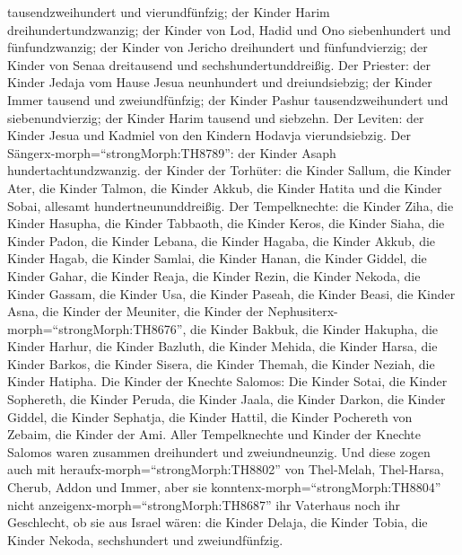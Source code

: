 tausendzweihundert und vierundfünfzig;  der Kinder Harim
dreihundertundzwanzig;  der Kinder von Lod, Hadid und Ono
siebenhundert und fünfundzwanzig;  der Kinder von Jericho
dreihundert und fünfundvierzig;  der Kinder von Senaa
dreitausend und sechshundertunddreißig.  Der Priester: der
Kinder Jedaja vom Hause Jesua neunhundert und dreiundsiebzig;
 der Kinder Immer tausend und zweiundfünfzig; 
der Kinder Pashur tausendzweihundert und siebenundvierzig; 
der Kinder Harim tausend und siebzehn.  Der Leviten: der
Kinder Jesua und Kadmiel von den Kindern Hodavja vierundsiebzig.
 Der Sängerx-morph=``strongMorph:TH8789'': der Kinder Asaph
hundertachtundzwanzig.  der Kinder der Torhüter: die Kinder
Sallum, die Kinder Ater, die Kinder Talmon, die Kinder Akkub, die Kinder
Hatita und die Kinder Sobai, allesamt hundertneununddreißig.
 Der Tempelknechte: die Kinder Ziha, die Kinder Hasupha,
die Kinder Tabbaoth,  die Kinder Keros, die Kinder Siaha,
die Kinder Padon,  die Kinder Lebana, die Kinder Hagaba,
die Kinder Akkub,  die Kinder Hagab, die Kinder Samlai, die
Kinder Hanan,  die Kinder Giddel, die Kinder Gahar, die
Kinder Reaja,  die Kinder Rezin, die Kinder Nekoda, die
Kinder Gassam,  die Kinder Usa, die Kinder Paseah, die
Kinder Beasi,  die Kinder Asna, die Kinder der Meuniter,
die Kinder der Nephusiterx-morph=``strongMorph:TH8676'', 
die Kinder Bakbuk, die Kinder Hakupha, die Kinder Harhur, 
die Kinder Bazluth, die Kinder Mehida, die Kinder Harsa, 
die Kinder Barkos, die Kinder Sisera, die Kinder Themah, 
die Kinder Neziah, die Kinder Hatipha.  Die Kinder der
Knechte Salomos: Die Kinder Sotai, die Kinder Sophereth, die Kinder
Peruda,  die Kinder Jaala, die Kinder Darkon, die Kinder
Giddel,  die Kinder Sephatja, die Kinder Hattil, die Kinder
Pochereth von Zebaim, die Kinder der Ami.  Aller
Tempelknechte und Kinder der Knechte Salomos waren zusammen dreihundert
und zweiundneunzig.  Und diese zogen auch mit
heraufx-morph=``strongMorph:TH8802'' von Thel-Melah, Thel-Harsa, Cherub,
Addon und Immer, aber sie konntenx-morph=``strongMorph:TH8804'' nicht
anzeigenx-morph=``strongMorph:TH8687'' ihr Vaterhaus noch ihr
Geschlecht, ob sie aus Israel wären:  die Kinder Delaja,
die Kinder Tobia, die Kinder Nekoda, sechshundert und zweiundfünfzig.
